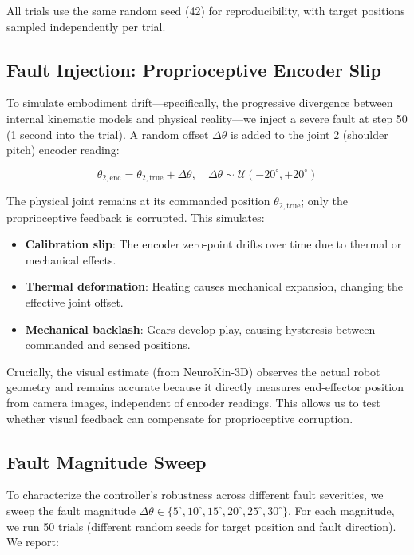 ﻿\documentclass[12pt,a4paper,oneside]{report}
\begin{document}
All trials use the same random seed (42) for reproducibility, with target positions sampled independently per trial.

\subsection{Fault Injection: Proprioceptive Encoder Slip}

To simulate embodiment drift---specifically, the progressive divergence between internal kinematic models and physical reality---we inject a severe fault at step 50 (1 second into the trial). A random offset $\Delta \theta$ is added to the joint 2 (shoulder pitch) encoder reading:

\begin{equation}
\theta_{2,\text{enc}} = \theta_{2,\text{true}} + \Delta \theta, \quad \Delta \theta \sim \mathcal{U}(-20^\circ, +20^\circ)
\end{equation}

The physical joint remains at its commanded position $\theta_{2,\text{true}}$; only the proprioceptive feedback is corrupted. This simulates:

\begin{itemize}
    \item \textbf{Calibration slip}: The encoder zero-point drifts over time due to thermal or mechanical effects.
    \item \textbf{Thermal deformation}: Heating causes mechanical expansion, changing the effective joint offset.
    \item \textbf{Mechanical backlash}: Gears develop play, causing hysteresis between commanded and sensed positions.
\end{itemize}

Crucially, the visual estimate (from NeuroKin-3D) observes the actual robot geometry and remains accurate because it directly measures end-effector position from camera images, independent of encoder readings. This allows us to test whether visual feedback can compensate for proprioceptive corruption.

\subsection{Fault Magnitude Sweep}

To characterize the controller's robustness across different fault severities, we sweep the fault magnitude $\Delta \theta \in \{5^\circ, 10^\circ, 15^\circ, 20^\circ, 25^\circ, 30^\circ\}$. For each magnitude, we run 50 trials (different random seeds for target position and fault direction). We report:
\end{document}
